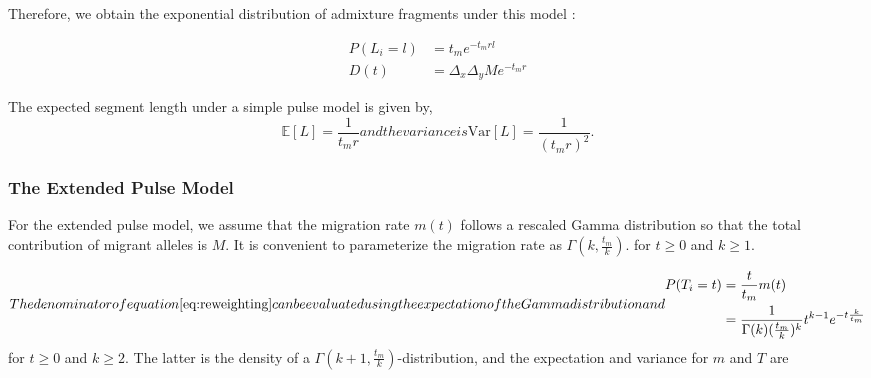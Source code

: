 \documentclass[11pt]{article}
\begin{document}
	
Therefore, we obtain the exponential distribution of admixture fragments under this model \citep[e.g.][]{moorjani_history_2011}:

\begin{subequations}
\begin{align}
\label{eq:Likelihood_function_simple_pulse}
	P(L_i=l) &= t_me^{-t_m r l}\\
	D(t) &= \Delta_x\Delta_y M e^{-t_m r}
\end{align}
\end{subequations}	

The expected segment length under a simple pulse model is given by,
\begin{subequations}

\begin{equation}
\label{eq:Expected_l_simple_pulse}
\mathbb{E}[L]=\frac{1}{t_m r}
\end{equation}
	
and the variance is
\begin{equation}
\label{eq:Expected_v_simple_pulse}
\text{Var}[L]=\frac{1}{(t_m r)^2} \text{.}
\end{equation}
\end{subequations}	

\subsubsection{The Extended Pulse Model}\label{The Extended Pulse Model}
	
For the extended pulse model, we assume that the migration rate $m(t)$ follows a rescaled Gamma distribution so that the total contribution of migrant alleles is $M$.  It is convenient to parameterize the migration rate as $\Gamma(k,\frac{t_m}{k})$.
for $t \geq 0$ and $k \geq 1$. 

\begin{subequations}
The denominator of equation \ref{eq:reweighting} can be evaluated using the expectation of the Gamma distribution and

\begin{align}
\label{eq:Gamma_density}
    P(T_i=t) &= \frac{t}{t_m}m(t)\\
        &=\frac{1}{\Gamma(k)(\frac{t_m}{k})^k}t^{k-1}e^{-t\frac{k}{t_m}} 
\end{align}
\end{subequations}
for $t \geq 0$ and $k \geq 2$. The latter is the density of a $\Gamma(k+1, \frac{t_m}{k})$-distribution, and the expectation and variance for $m$ and $T$ are 
	
\end{document}
